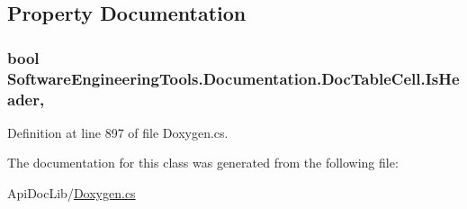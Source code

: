 \subsection{Property Documentation}
\hypertarget{class_software_engineering_tools_1_1_documentation_1_1_doc_table_cell_a7a00159fc2303f32540477f1ea4b7f59}{
\subsubsection[{Is\+Header}]{\setlength{\rightskip}{0pt plus 5cm}bool Software\+Engineering\+Tools.\+Documentation.\+Doc\+Table\+Cell.\+Is\+Header\hspace{0.3cm}{\ttfamily [get]}, {\ttfamily [set]}}}\label{class_software_engineering_tools_1_1_documentation_1_1_doc_table_cell_a7a00159fc2303f32540477f1ea4b7f59}


Definition at line 897 of file Doxygen.\+cs.



The documentation for this class was generated from the following file\+:\begin{DoxyCompactItemize}
\item 
Api\+Doc\+Lib/\hyperlink{_doxygen_8cs}{Doxygen.\+cs}\end{DoxyCompactItemize}
